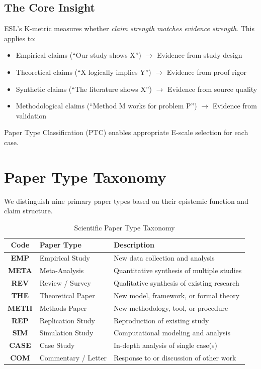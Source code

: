 \documentclass[11pt,a4paper]{article}
\begin{document}
\subsection{The Core Insight}

ESL's K-metric measures whether \textit{claim strength matches evidence strength}. This applies to:

\begin{itemize}
    \item Empirical claims (``Our study shows X'') $\rightarrow$ Evidence from study design
    \item Theoretical claims (``X logically implies Y'') $\rightarrow$ Evidence from proof rigor
    \item Synthetic claims (``The literature shows X'') $\rightarrow$ Evidence from source quality
    \item Methodological claims (``Method M works for problem P'') $\rightarrow$ Evidence from validation
\end{itemize}

Paper Type Classification (PTC) enables appropriate E-scale selection for each case.


\section{Paper Type Taxonomy}
\label{sec:taxonomy}

We distinguish nine primary paper types based on their epistemic function and claim structure.

\begin{table}[h]
\centering
\caption{Scientific Paper Type Taxonomy}
\label{tab:taxonomy}
\begin{tabular}{clp{6cm}}
\toprule
\textbf{Code} & \textbf{Paper Type} & \textbf{Description} \\
\midrule
\textbf{EMP} & Empirical Study & New data collection and analysis \\
\textbf{META} & Meta-Analysis & Quantitative synthesis of multiple studies \\
\textbf{REV} & Review / Survey & Qualitative synthesis of existing research \\
\textbf{THE} & Theoretical Paper & New model, framework, or formal theory \\
\textbf{METH} & Methods Paper & New methodology, tool, or procedure \\
\textbf{REP} & Replication Study & Reproduction of existing study \\
\textbf{SIM} & Simulation Study & Computational modeling and analysis \\
\textbf{CASE} & Case Study & In-depth analysis of single case(s) \\
\textbf{COM} & Commentary / Letter & Response to or discussion of other work \\
\bottomrule
\end{tabular}
\end{table}
\end{document}
